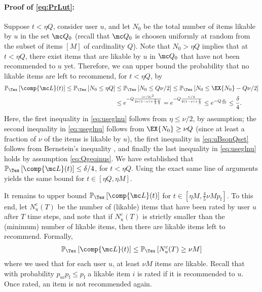 \documentclass{article}
\newcommand\pf{p_{\mathrm{f}}}
\newcommand{\setQ}{\mc Q}
\renewcommand\PR[2][\Tex]{
\ifthenelse{\equal{#1}{}}{{\mathbb P}\left[#2\right]}{\ensuremath{{\mathbb P}_{#1}\left[ #2\right]}}}
\begin{document}
\paragraph{Proof of \eqref{eq:PrLut}:}
Suppose $t < \eta Q$, %
consider user $u$, and let $N_0$ be the total number of  items likable by $u$ in the set $\setQ_0$ (recall that $\setQ_0$ is choosen uniformly at random from the subset of items $[M]$ of cardinality $Q$). 
Note that $N_0 > \eta Q$ implies that at $t < \eta Q$, there exist items that are likable by $u$ in $\setQ_0$ that have not been recommended to $u$ yet. 
Therefore, we can upper bound the probability that no likable items are left to recommend, for $t < \eta Q$, by
\begin{align}
\PR{ \comp{\mc L}(t) }
\leq
\PR{N_0 \leq \eta Q}
%
&\leq
\PR{ N_0 \leq Q \nu/2 }
%
\leq
\PR{N_0 \leq \EX{N_0} - Q \nu/2 } \label{eq:useglnu} \\
%
&\leq 
e^{-Q \frac{ (\nu/2)^2}{2 \nu (1-\nu) + \frac{2}{3} \frac{\nu}{2}}
}
%
=
e^{-Q \frac{ \nu/4}{2 (1-\nu) + \frac{1}{3}}}
%
\leq 
e^{-Q \frac{\nu}{10}}
%
\leq \frac{\delta}{4}.
\label{eq:uBsonQset}
\end{align}
Here, the first inequality in \eqref{eq:useglnu} follows from $\eta \leq \nu/2$, by assumption; the second inequality in \eqref{eq:useglnu} follows from $\EX{N_0} \geq \nu Q$ (since at least a fraction of $\nu$ of the items is likable by $u$), 
the first inequality in \eqref{eq:uBsonQset} follows from Bernstein's inequality \cite{bardenet_concentration_2015}, and finally the last inequality in \eqref{eq:useglnu} holds by assumption \eqref{eq:Qgeqinus}. 
We have established that $\PR{\comp{\mc L}(t) } \leq \delta/4$, for $t < \eta Q$. 
Using the exact same line of arguments yields the same bound for $t \in [\eta Q,  \eta M]$. 

It remains to upper bound $\PR{\comp{\mc L}(t)}$ for $t\in [\eta M , \frac{4}{5} \nu M \pf]$. 
To this end, let $N_{u}^c(T)$ be the number of (likable) items that have been 
rated by user $u$ after $T$ time steps, and note that 
if $N_{u}^c(T)$ is strictly smaller than the (minimum) number of likable items, then there are likable items left to recommend. 
Formally, 
\begin{align}
\PR{ \comp{\mc L}(t) }
\leq 
\PR{ N_u^c(T) \geq \nu M}
\label{eq:Nucgemu1}
\end{align}
where we used that for each user $u$, at least $\nu M$ items are likable. 
Recall that with probability $p_{ui}\pf \leq \pf$ a likable item $i$ is rated if it is recommended to $u$. Once rated, an item is not recommended again. 
\end{document}

